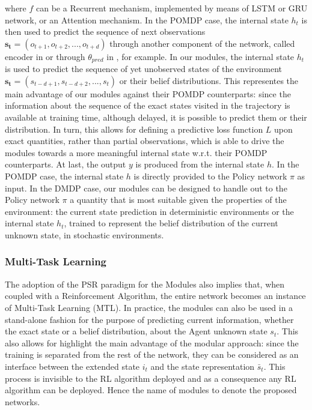                 where $f$ can be a Recurrent mechanism, implemented by means of LSTM or GRU network, or an Attention mechanism. In the POMDP case, the internal state $h_t$ is then used to predict the sequence of next observations $\mathbf{s_t} = (o_{t+1}, o_{t+2}, ..., o_{t+d})$ through another component of the network, called encoder in  or through $\theta_{pred}$ in , for example. In our modules, the internal state $h_t$ is used to predict the sequence of yet unobserved states of the environment $\mathbf{s_t} = (s_{t-d+1}, s_{t-d+2}, ..., s_t)$ or their belief distributions. This representes the main advantage of our modules against their POMDP counterparts: since the information about the sequence of the exact states visited in the trajectory is available at training time, although delayed, it is possible to predict them or their distribution. In turn, this allows for defining a predictive loss function $L$ upon exact quantities, rather than partial observations, which is able to drive the modules towards a more meaningful internal state w.r.t. their POMDP counterparts. \newline
                At last, the output $y$ is produced from the internal state $h$. In the POMDP case, the internal state $h$ is directly provided to the Policy network $\pi$ as input. In the DMDP case, our modules can be designed to handle out to the Policy network $\pi$ a quantity that is most suitable given the properties of the environment: the current state prediction in deterministic environments or the internal state $h_t$, trained to represent the belief distribution of the current unknown state, in stochastic environments.
                
            \subsubsection{Multi-Task Learning}
                The adoption of the PSR paradigm for the Modules also implies that, when coupled with a Reinforcement Algorithm, the entire network becomes an instance of Multi-Task Learning (MTL). In practice, the modules can also be used in a stand-alone fashion for the purpose of predicting current information, whether the exact state or a belief distribution, about the Agent unknown state $s_t$. \newline
                This also allows for highlight the main advantage of the modular approach: since the training is separated from the rest of the network, they can be considered as an interface between the extended state $i_t$ and the state representation $\bar{s}_t$. This process is invisible to the RL algorithm deployed and as a consequence any RL algorithm can be deployed. Hence the name of modules to denote the proposed networks. 
                
